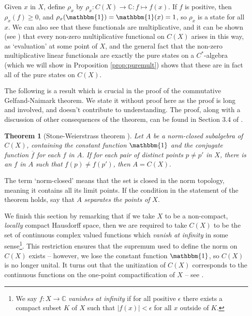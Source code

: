 \documentclass[11pt,a4paper]{report}
\theoremstyle{plain}
\newtheorem*{thm*}{Theorem}
\theoremstyle{definition}
\newcommand{\1}{\mathbbm{1}}
\newcommand{\C}{\mathbb{C}}
\newcommand{\CX}{C(X)}
\renewcommand{\bar}{\overline}
\begin{document}
Given $x$ in $X$, define $\rho_x$ by $\rho_x:\CX\to\C:f\mapsto f(x)$. If $f$ is 
positive, then $\rho_x(f) \geq 0$, and $\rho_x(\1) = \1(x)=1$, so $\rho_x$ is a 
state for all $x$. We can also see that these functionals are multiplicative, 
and it can be shown (see \cite[Corollary 3.4.2]{kadison83}) that every non-zero 
multiplicative functional on $\CX$ arises in this way, as `evaluation' at some 
point of $X$, and the general fact that the non-zero multiplicative linear 
functionals are exactly the pure states on a $C^\ast$-algebra (which we will 
show in Proposition \ref{prop:puremult}) shows that these are in fact all of the 
pure states on $\CX$.


The following is a result which is crucial in the proof of the commutative 
Gelfand-Naimark theorem. We state it without proof here as the proof is long and 
involved, and doesn't contribute to understanding. The proof, along with a 
discussion of other consequences of the theorem, can be found in Section 3.4 of 
\cite{kadison83}.


\begin{thm*}[Stone-Weierstrass theorem {\cite[3.4.15]{kadison83}}]
	Let $A$ be a norm-closed subalgebra of $\CX$, containing the constant function 
	$\1$ and the conjugate function $\bar f$ for each $f$ in $A$. If for each pair 
	of distinct points $p\not=p'$ in $X$, there is an $f$ in $A$ such that 
	$f(p)\not=f(p')$, then $A=\CX$.

\end{thm*}

The term `norm-closed' means that the set is closed in the norm topology, 
meaning it contains all its limit points. If the condition in the statement of 
the theorem holds, say that \emph{$A$ separates the points of $X$}.


We finish this section by remarking that if we take $X$ to be a non-compact, 
\emph{locally} compact Hausdorff space, then we are required to take $\CX$ to be 
the set of continuous complex valued functions which \emph{vanish at infinity} 
in some sense\footnote{We say $f:X\to\C$ \emph{vanishes at infinity} if for all 
positive $\epsilon$ there exists a compact subset $K$ of $X$ such that 
$\left|f(x)\right|<\epsilon$ for all $x$ outside of $K$.}. This restriction 
ensures that the supremum used to define the norm on $\CX$ exists -- however, we 
lose the constant function $\1$, so $\CX$ is no longer unital. 
It turns out that the unitization of $\CX$ corresponds to the continuous 
functions on the one-point compactification of $X$ -- see 
\cite[II.1.2.2]{blackadar06}.
\end{document}
